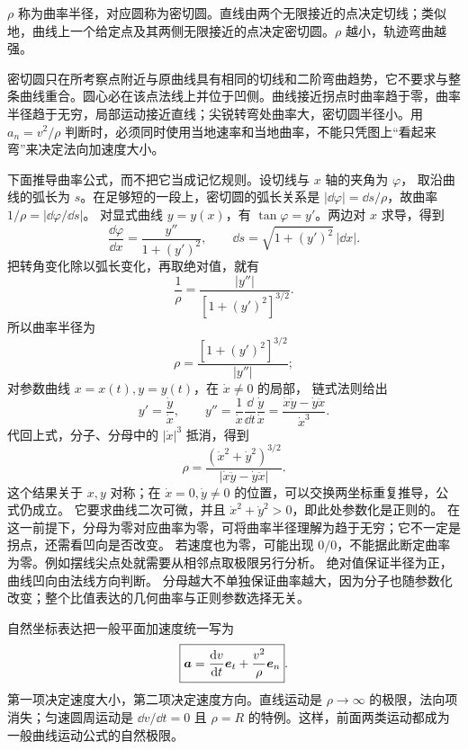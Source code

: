 {\OsculatingCircleDiagram

$\rho$ 称为曲率半径，对应圆称为密切圆。直线由两个无限接近的点决定切线；类似地，曲线上一个给定点及其两侧无限接近的点决定密切圆。$\rho$ 越小，轨迹弯曲越强。

密切圆只在所考察点附近与原曲线具有相同的切线和二阶弯曲趋势，它不要求与整条曲线重合。圆心必在该点法线上并位于凹侧。曲线接近拐点时曲率趋于零，曲率半径趋于无穷，局部运动接近直线；尖锐转弯处曲率大，密切圆半径小。用 $a_n=v^2/\rho$ 判断时，必须同时使用当地速率和当地曲率，不能只凭图上“看起来弯”来决定法向加速度大小。

下面推导曲率公式，而不把它当成记忆规则。设切线与 $x$ 轴的夹角为 $\varphi$，
取沿曲线的弧长为 $s$。在足够短的一段上，密切圆的弧长关系是
$|\dd\varphi|=\dd s/\rho$，故曲率 $1/\rho=|\dd\varphi/\dd s|$。
对显式曲线 $y=y(x)$，有 $\tan\varphi=y'$。两边对 $x$ 求导，得到
\[
 \frac{\dd\varphi}{\dd x}=\frac{y''}{1+(y')^2},
 \qquad \dd s=\sqrt{1+(y')^2}\,|\dd x|.
\]
把转角变化除以弧长变化，再取绝对值，就有
\[
 \frac1\rho=\frac{|y''|}{[1+(y')^2]^{3/2}}.
\]
所以曲率半径为
\begin{equation}
 \rho=\frac{[1+(y')^2]^{3/2}}{|y''|};
\end{equation}
对参数曲线 $x=x(t),y=y(t)$，在 $\dot x\ne0$ 的局部，
链式法则给出
\[
 y'=\frac{\dot y}{\dot x},\qquad
 y''=\frac1{\dot x}\frac{\dd}{\dd t}\frac{\dot y}{\dot x}
 =\frac{\dot x\ddot y-\dot y\ddot x}{\dot x^3}.
\]
代回上式，分子、分母中的 $|\dot x|^3$ 抵消，得到
\begin{equation}
 \rho=\frac{(\dot x^2+\dot y^2)^{3/2}}
 {|\dot x\ddot y-\dot y\ddot x|}.
\end{equation}
这个结果关于 $x,y$ 对称；在 $\dot x=0,\dot y\ne0$ 的位置，可以交换两坐标重复推导，公式仍成立。
它要求曲线二次可微，并且 $\dot x^2+\dot y^2>0$，即此处参数化是正则的。
在这一前提下，分母为零对应曲率为零，可将曲率半径理解为趋于无穷；它不一定是拐点，还需看凹向是否改变。
若速度也为零，可能出现 $0/0$，不能据此断定曲率为零。例如摆线尖点处就需要从相邻点取极限另行分析。
绝对值保证半径为正，曲线凹向由法线方向判断。
分母越大不单独保证曲率越大，因为分子也随参数化改变；整个比值表达的几何曲率与正则参数选择无关。

自然坐标表达把一般平面加速度统一写为
\begin{equation}
 \boxed{\bm{a}=\frac{\mathop{}\!\mathrm d v}{\mathop{}\!\mathrm d t}\bm{e}_t+\frac{v^2}{\rho}\bm{e}_n}.
\end{equation}
第一项决定速度大小，第二项决定速度方向。直线运动是 $\rho\to\infty$ 的极限，法向项消失；匀速圆周运动是 $\dd v/\dd t=0$ 且 $\rho=R$ 的特例。这样，前面两类运动都成为一般曲线运动公式的自然极限。

}
